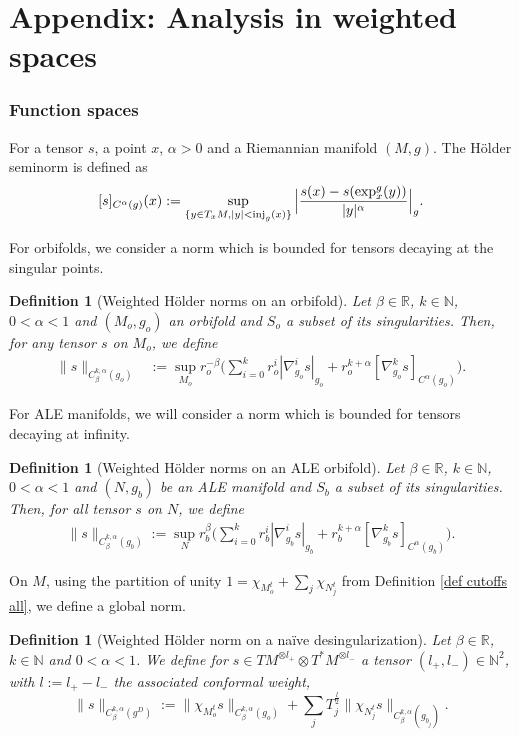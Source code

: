 \documentclass[11pt,reqno]{amsart}
\numberwithin{equation}{section}
\newtheorem{defn}[thm]{Definition}
\theoremstyle{definition}
\theoremstyle{remark}
\begin{document}
\appendix

\part{Appendix: Analysis in weighted spaces}\label{function spaces}

   \section{Function spaces}\label{sec:function spaces}
    
    For a tensor $s$, a point $x$, $\alpha>0$ and a Riemannian manifold $(M,g)$. The Hölder seminorm is defined as
$$ [s]_{C^\alpha(g)}(x):= \sup_{\{y\in T_xM,|y|< \textup{inj}_g(x)\}} \Big| \frac{s(x)-s(\exp^g_x(y))}{|y|^\alpha} \Big|_g.$$

For orbifolds, we consider a norm which is bounded for tensors decaying at the singular points.
\begin{defn}[Weighted Hölder norms on an orbifold]\label{norme orbifold}
    Let $\beta\in \mathbb{R}$, $k\in\mathbb{N}$, $0<\alpha<1$ and $(M_o,g_o)$ an orbifold and $S_o$ a subset of its singularities. Then, for any tensor $s$ on $M_o$, we define
    \begin{align*}
        \| s \|_{C^{k,\alpha}_{\beta}(g_o)} &:= \sup_{M_o}r_o^{-\beta}\Big(\sum_{i=0}^k r_o^{i}|\nabla_{g_o}^i s|_{g_o} + r_o^{k+\alpha}[\nabla_{g_o}^ks]_{C^\alpha(g_o)}\Big).
    \end{align*}
\end{defn}

For ALE manifolds, we will consider a norm which is bounded for tensors decaying at infinity.

\begin{defn}[Weighted Hölder norms on an ALE orbifold]\label{norme ALE}
Let $\beta\in \mathbb{R}$, $k\in\mathbb{N}$, $0<\alpha<1$ and $(N,g_b)$ be an ALE manifold and $S_b$ a subset of its singularities. Then, for all tensor $s$ on $N$, we define
   \begin{align*}
       \| s \|_{C^{k,\alpha}_{\beta}(g_b)}:= \sup_{N}r_b^\beta\Big( \sum_{i=0}^kr_b^{i}|\nabla_{g_b}^i s|_{g_b} + r_b^{k+\alpha}[\nabla_{g_b}^ks]_{C^\alpha({g_b})}\Big).
   \end{align*}
\end{defn}

On $M$, using the partition of unity 
$1= \chi_{M_o^t} + \sum_j \chi_{N_j^t}$ from Definition \ref{def cutoffs all}, we define a global norm.
\begin{defn}[Weighted Hölder norm on a naïve desingularization]\label{norme a poids M}
		Let $\beta\in \mathbb{R}$, $k\in\mathbb{N}$ and $0<\alpha<1$. We define for $s\in TM^{\otimes l_+}\otimes T^*M^{\otimes l_-}$ a tensor $(l_+,l_-)\in \mathbb{N}^2$, with $l:= l_+-l_-$ the associated conformal weight,
		$$ \|s\|_{C^{k,\alpha}_{\beta}(g^D)}:= \| \chi_{M_o^t} s \|_{C^{k,\alpha}_{\beta}(g_o)} + \sum_j T_j^{\frac{l}{2}}\|\chi_{N_{j}^t}s\|_{C^{k,\alpha}_{\beta}(g_{b_j})}.$$
\end{defn}
\end{document}
